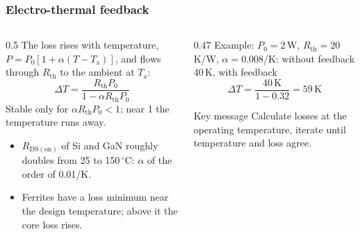 \begin{frame}
	\frametitle{Electro-thermal feedback}
	\begin{columns}[T]
		\begin{column}{0.5\textwidth}
			\small
			The loss rises with temperature, $P=P_0\left[1+\alpha(T-T_\mathrm{a})\right]$, and flows through $R_\mathrm{th}$ to the ambient at $T_\mathrm{a}$:
			\begin{equation*}
				\Delta T=\frac{R_\mathrm{th}P_0}{1-\alpha R_\mathrm{th}P_0}
			\end{equation*}
			Stable only for $\alpha R_\mathrm{th}P_0<1$; near 1 the temperature runs away.
			\begin{itemize}
				\item $R_\mathrm{DS(on)}$ of Si and GaN roughly doubles from 25 to 150\,$^\circ$C: $\alpha$ of the order of 0.01/K.
				\item Ferrites have a loss minimum near the design temperature; above it the core loss rises.
			\end{itemize}
		\end{column}
		\begin{column}{0.47\textwidth}
			\small
			Example: $P_0=2$\,W, $R_\mathrm{th}=20$\,K/W, $\alpha=0.008$/K: without feedback 40\,K, with feedback
			\begin{equation*}
				\Delta T=\frac{40\,\mathrm{K}}{1-0.32}=59\,\mathrm{K}
			\end{equation*}
			\begin{block}{Key message}
				Calculate losses at the operating temperature, iterate until temperature and loss agree.
			\end{block}
		\end{column}
	\end{columns}
\end{frame}

